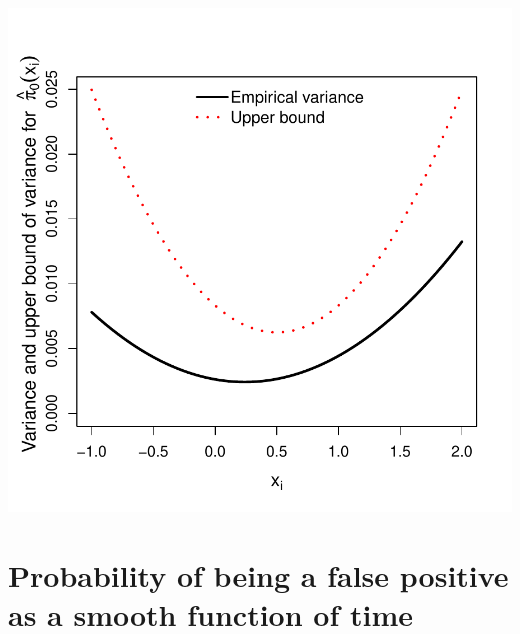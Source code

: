\documentclass{article}\usepackage[]{graphicx}\usepackage[]{color}
\makeatletter
\def\maxwidth{ %
  \ifdim\Gin@nat@width>\linewidth
    \linewidth
  \else
    \Gin@nat@width
  \fi
}
\newenvironment{knitrout}{}{} %
\makeatother
\begin{document}
\begin{knitrout}
{\centering \includegraphics[width=\maxwidth]{figures/Fig2a-1} 

}



\end{knitrout}

\section{Probability of being a false positive as a smooth function of time}
\end{document}
